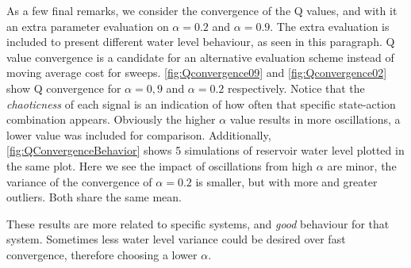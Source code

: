 As a few final remarks, we consider the convergence of the Q values, and with it an extra parameter evaluation on $\alpha = 0.2$ and $\alpha = 0.9$. The extra evaluation is included to present different water level behaviour, as seen in this paragraph. Q value convergence is a candidate for an alternative evaluation scheme instead of moving average cost for sweeps. \cref{fig:Qconvergence09} and \cref{fig:Qconvergence02} show Q convergence for $\alpha = 0,9$ and $\alpha = 0.2$ respectively. Notice that the \textit{chaoticness} of each signal is an indication of how often that specific state-action combination appears. Obviously the higher $\alpha$ value results in more oscillations, a lower value was included for comparison. Additionally, \cref{fig:QConvergenceBehavior} shows 5 simulations of reservoir water level plotted in the same plot. Here we see the impact of oscillations from high $\alpha$ are minor, the variance of the convergence of $\alpha = 0.2$ is smaller, but with more and greater outliers. Both share the same mean.

These results are more related to specific systems, and \textit{good} behaviour for that system. Sometimes less water level variance could be desired over fast convergence, therefore choosing a lower $\alpha$.

